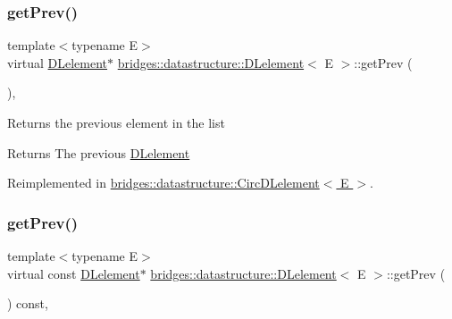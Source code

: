 \subsubsection{\texorpdfstring{get\+Prev()}{getPrev()}\hspace{0.1cm}{\footnotesize\ttfamily [1/2]}}
{\footnotesize\ttfamily template$<$typename E$>$ \\
virtual \hyperlink{classbridges_1_1datastructure_1_1_d_lelement}{D\+Lelement}$\ast$ \hyperlink{classbridges_1_1datastructure_1_1_d_lelement}{bridges\+::datastructure\+::\+D\+Lelement}$<$ E $>$\+::get\+Prev (\begin{DoxyParamCaption}{ }\end{DoxyParamCaption})\hspace{0.3cm}{\ttfamily [inline]}, {\ttfamily [virtual]}}

Returns the previous element in the list \begin{DoxyReturn}{Returns}
The previous \hyperlink{classbridges_1_1datastructure_1_1_d_lelement}{D\+Lelement} 
\end{DoxyReturn}


Reimplemented in \hyperlink{classbridges_1_1datastructure_1_1_circ_d_lelement_a5218bb590a588e1d1aaa8f53403ed0cb}{bridges\+::datastructure\+::\+Circ\+D\+Lelement$<$ E $>$}.

\mbox{\label{classbridges_1_1datastructure_1_1_d_lelement_a66917ba9a9270b8f6b5e4ff258bf3e70}} 
\subsubsection{\texorpdfstring{get\+Prev()}{getPrev()}\hspace{0.1cm}{\footnotesize\ttfamily [2/2]}}
{\footnotesize\ttfamily template$<$typename E$>$ \\
virtual const \hyperlink{classbridges_1_1datastructure_1_1_d_lelement}{D\+Lelement}$\ast$ \hyperlink{classbridges_1_1datastructure_1_1_d_lelement}{bridges\+::datastructure\+::\+D\+Lelement}$<$ E $>$\+::get\+Prev (\begin{DoxyParamCaption}{ }\end{DoxyParamCaption}) const\hspace{0.3cm}{\ttfamily [inline]}, {\ttfamily [virtual]}}

